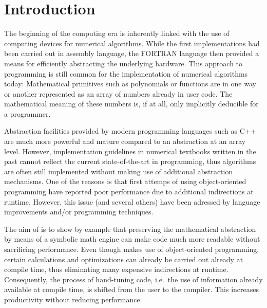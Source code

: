 
\chapter*{Introduction}    \label{intro}

The beginning of the computing era is inherently linked with the use of computing devices for numerical algorithms.
While the first implementations had been carried out in assembly language, the FORTRAN language then provided a means for efficiently abstracting the underlying hardware.
This approach to programming is still common for the implementation of numerical algorithms today:
Mathematical primitives such as polynomials or functions are in one way or another represented as an array of numbers already in user code.
The mathematical meaning of these numbers is, if at all, only implicitly deducible for a programmer.

Abstraction facilities provided by modern programming languages such as C++ are much more powerful and mature compared to an abstraction at an array level.
However, implementation guidelines in numerical textbooks written in the past cannot reflect the current state-of-the-art in programming,
thus algorithms are often still implemented without making use of additional abstraction mechanisms.
One of the reasons is that first attemps of using object-oriented programming have reported poor performance due to additional indirections at runtime.
However, this issue (and several others) have been adressed by language improvements and/or programming techniques.

The aim of {\ViennaMath} is to show by example that preserving the mathematical abstraction by means of a symbolic math engine can make code much more readable without sacrificing performance.
Even though {\ViennaMath} makes use of object-oriented programming, certain calculations and optimizations can already be carried out already at compile time, thus eliminating many expensive indirections at runtime.
Consequently, the process of hand-tuning code, i.e.~the use of information already available at compile time, is shifted from the user to the compiler.
This increases productivity without reducing performance.









